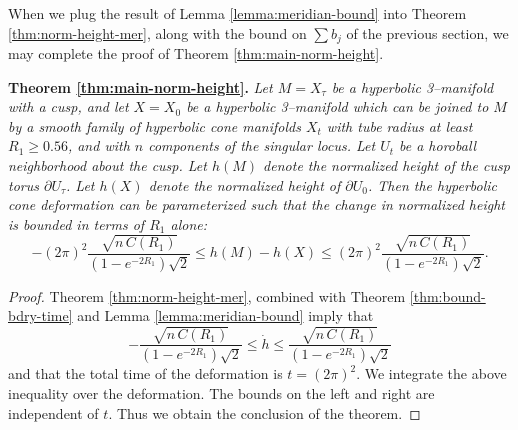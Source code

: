 When we plug the result of Lemma \ref{lemma:meridian-bound} into
Theorem \ref{thm:norm-height-mer}, along with the bound on $\sum b_j$
of the previous section, we may complete the proof of Theorem
\ref{thm:main-norm-height}.

\medskip

\noindent\textbf{Theorem \ref{thm:main-norm-height}.} \emph{
  Let $M=X_\tau$ be a hyperbolic 3--manifold with a cusp, and let
  $X=X_0$ be a hyperbolic 3--manifold which can be joined to $M$ by a
  smooth family of hyperbolic cone manifolds $X_t$ with tube radius at
  least $R_1 \geq 0.56$, and with $n$ components of the singular
  locus. Let $U_t$ be a horoball neighborhood about
  the cusp.  Let $h(M)$ denote the normalized height of the cusp torus
  $\partial U_\tau$.  Let $h(X)$ denote the normalized height of
  $\partial U_0$.  Then the
	hyperbolic cone deformation can be parameterized such that the
	change in normalized height is bounded in
  terms of $R_1$ alone:
$$-(2\pi)^2\frac{\sqrt{n\,C(R_1)}}{(1-e^{-2R_1})\sqrt{2}} \leq
 h(M) - h(X) \leq
(2\pi)^2\frac{\sqrt{n\,C(R_1)}}{(1-e^{-2R_1})\sqrt{2}}.$$
}

\begin{proof}
  Theorem \ref{thm:norm-height-mer}, combined with Theorem
  \ref{thm:bound-bdry-time} and Lemma \ref{lemma:meridian-bound}
  imply that
$$
  -\frac{\sqrt{n\,C(R_1)}}{(1-e^{-2R_1})\sqrt{2}} \leq \dot{h} \leq
\frac{\sqrt{n\,C(R_1)}}{(1-e^{-2R_1})\sqrt{2}}
$$
and that the total time of the deformation is $t=(2\pi)^2$.  We
integrate the above inequality over the deformation.  The bounds on
the left and right are independent of $t$.  Thus we obtain the
conclusion of the theorem.
\end{proof}
